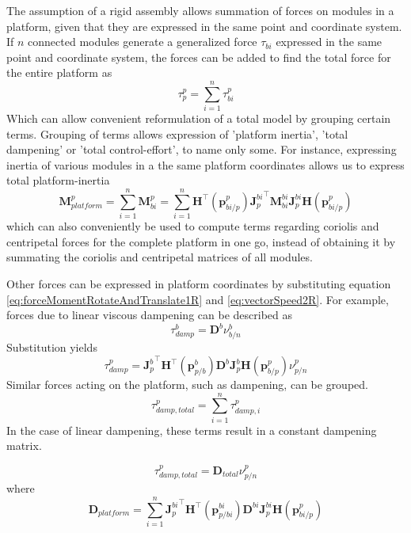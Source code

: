 The assumption of a rigid assembly allows summation of forces on modules in a platform, given that they are expressed in the same point and coordinate system. If $n$ connected modules generate a generalized force $\tau_{bi}$ expressed in the same point and coordinate system, the forces can be added to find the total force for the entire platform as
\begin{equation} 
	\tau_{p}^{p} = \sum_{i =1}^{n} \tau_{bi}^{p}
\end{equation}
Which can allow convenient reformulation of a total model by grouping certain terms. Grouping of terms allows expression of 'platform inertia', 'total dampening' or 'total control-effort', to name only some. For instance, expressing inertia of various modules in a the same platform coordinates allows us to express total platform-inertia
\begin{equation}
	\textbf{M}_{platform}^{p} = \sum_{i=1}^{n} \textbf{M}_{bi}^{p} = \sum_{i=1}^{n} \textbf{H}^{\top}(\textbf{p}_{bi/p}^{p}){\textbf{J}_{p}^{bi}}^{\top}  \textbf{M}_{bi}^{bi} \textbf{J}_{p}^{bi} \textbf{H}(\textbf{p}_{bi/p}^{p})
	\label{totalInertiaSummedR}
\end{equation}
which can also conveniently be used to compute terms regarding coriolis and centripetal forces for the complete platform in one go, instead of obtaining it by summating the coriolis and centripetal matrices of all modules. 

Other forces can be expressed in platform coordinates by substituting equation \ref{eq:forceMomentRotateAndTranslate1R} and \ref{eq:vectorSpeed2R}. For example, forces due to linear viscous dampening can be described as
\begin{equation}
	\tau_{damp}^{b} = \textbf{D}^{b} \nu_{b/n}^{b}
\end{equation}
Substitution yields
\begin{equation}
	\tau_{damp}^{p} = {\textbf{J}_{p}^{b}}^\top \textbf{H}^\top (\textbf{p}_{p/b}^{b}) \textbf{D}^{b} \textbf{J}_{p}^{b} \textbf{H}(\textbf{p}_{b/p}^{p}) \nu_{p/n}^{p}
\end{equation}
Similar forces acting on the platform, such as dampening, can be grouped. 
\begin{equation}
	\tau_{damp,total}^{p} = \sum_{i=1}^{n} \tau_{damp,i}^{p}
\end{equation}
In the case of linear dampening, these terms result in a constant dampening matrix. 

\begin{equation}
	\tau_{damp,total}^{p} = \textbf{D}_{total} \nu_{p/n}^{p} 
	\label{linearDameningTotalR}
\end{equation}
where 
\begin{equation}
	\textbf{D}_{platform} = \sum_{i=1}^{n} {\textbf{J}_{p}^{bi}}^\top \textbf{H}^\top (\textbf{p}_{p/bi}^{bi}) \textbf{D}^{bi} \textbf{J}_{p}^{bi} \textbf{H}(\textbf{p}_{bi/p}^{p})
\end{equation}

